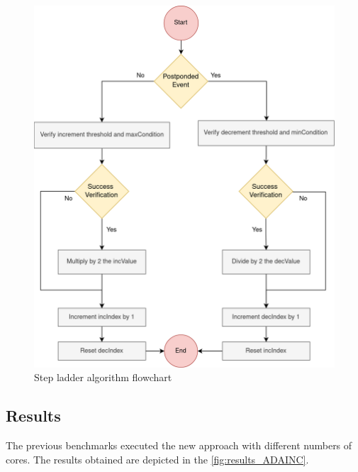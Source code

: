 \begin{figure}[H]
	\centering
 	\includegraphics[width=0.6\linewidth]{Images/incAlgorithm_flowchart.png}
 	\caption{Step ladder algorithm flowchart}
	 \label{fig_incAlgorithm_flowchart}
\end{figure}

\subsection{Results}

The previous benchmarks executed the new approach with different numbers of cores. The results obtained are depicted in the 
\autoref{fig:results_ADAINC}. 

